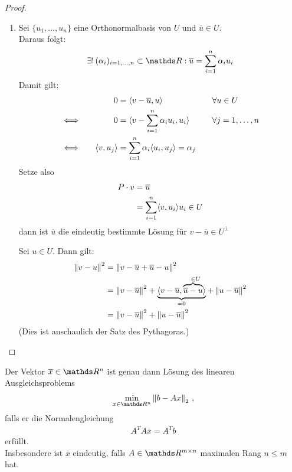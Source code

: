 \begin{proof}
  \begin{enumerate}[1)]
  \item Sei $\{u_1, \dots , u_n \}$ eine Orthonormalbasis von $U$ 
    und $\overline{u}\in U $. \\
    Daraus folgt:
    \begin{gather*}
      \exists ! \, (\alpha_i)_{i=1,\dotsc,n} \subset \R: \overline{u} = \sum_{i=1}^{n} \alpha_i u_i
    \end{gather*}
    Damit gilt:
    \begin{alignat*}{3}
      &&0 &= \langle v-\overline{u}, u \rangle &\quad& \forall u \in U \\
      &\Longleftrightarrow \quad& 0 &= \langle v- \sum_{i=1}^{n} \alpha_i u_i, u_i \rangle &\quad &\forall j=1, \dots , n\\
      &\Longleftrightarrow  & \langle v, u_j \rangle &= \sum_{i=1}^{n} \alpha_i \langle u_i, u_j \rangle = \alpha_j
    \end{alignat*}
    Setze also 
    \begin{align}
      \nonumber
      P\cdot v &= \overline{u} \\
               & = \sum_{i=1}^{n} \langle v, u_i \rangle u_i \in U
                 \label{IV.3.4}
    \end{align}
    dann ist $\overline{u}$ die eindeutig bestimmte Lösung für $ v-\overline{u} \in U^\bot$
    
    \imagemissing{}\label{im4.3.3}
    
    Sei  $u\in U$. Dann gilt:
    \begin{align}
      \nonumber
      \left\| v-u \right\|^2 &= \left\| v-\overline{u}+\overline{u} -u \right\|^2 \\ \nonumber
                 &= \left\| v-\overline{u} \right\|^2 +
                   \underbrace{\langle v-\overline{u}, \overbrace{\overline{u}-u}^{~~\in U} \rangle}_{=0}
                   + \left\| u-\overline{u} \right\|^2 \\
                 &= \left\| v-\overline{u} \right\|^2 + \left\| u-\overline{u} \right\|^2
                   \label{IV.3.5}
    \end{align}
    (Dies ist anschaulich der Satz des Pythagoras.)
  \end{enumerate}
\end{proof}


\begin{Satze}
  Der Vektor $\overline{x} \in\R^n$ ist genau dann Lösung des linearen Ausgleichsproblems
  \begin{gather*}
    \min_{x\in\Ren} \nn{b-Ax}_2 \, ,
  \end{gather*}
  falls er die Normalengleichung
  \begin{gather}
    A^TA\overline{x} = A^Tb
    \label{IV.3.6}
  \end{gather}
  erfüllt. \\
  Insbesondere ist $\overline{x}$ eindeutig,
  falls $A\in \R^{m\times n}$ maximalen Rang $n\leq m$ hat.
\end{Satze}

